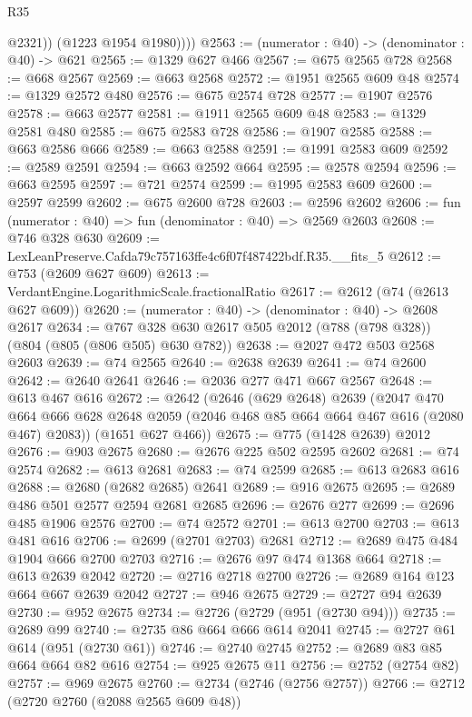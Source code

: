 \begin{lexlean}{R35}
\begin{coremodule}
              @2321))
          (@1223 @1954 @1980))))
@2563 := (numerator : @40) -> (denominator : @40) -> @621
@2565 := @1329 @627 @466
@2567 := @675 @2565 @728
@2568 := @668 @2567
@2569 := @663 @2568
@2572 := @1951 @2565 @609 @48
@2574 := @1329 @2572 @480
@2576 := @675 @2574 @728
@2577 := @1907 @2576
@2578 := @663 @2577
@2581 := @1911 @2565 @609 @48
@2583 := @1329 @2581 @480
@2585 := @675 @2583 @728
@2586 := @1907 @2585
@2588 := @663 @2586 @666
@2589 := @663 @2588
@2591 := @1991 @2583 @609
@2592 := @2589 @2591
@2594 := @663 @2592 @664
@2595 := @2578 @2594
@2596 := @663 @2595
@2597 := @721 @2574
@2599 := @1995 @2583 @609
@2600 := @2597 @2599
@2602 := @675 @2600 @728
@2603 := @2596 @2602
@2606 := fun (numerator : @40) => fun (denominator : @40) => @2569 @2603
@2608 := @746 @328 @630
@2609 := LexLeanPreserve.Cafda79c757163ffe4c6f07f487422bdf.R35.__fits_5
@2612 := @753 (@2609 @627 @609)
@2613 := VerdantEngine.LogarithmicScale.fractionalRatio
@2617 := @2612 (@74 (@2613 @627 @609))
@2620 := (numerator : @40) -> (denominator : @40) -> @2608 @2617
@2634 := @767 @328 @630 @2617 @505 @2012 (@788 (@798 @328)) (@804 (@805 (@806 @505) @630 @782))
@2638 := @2027 @472 @503 @2568 @2603
@2639 := @74 @2565
@2640 := @2638 @2639
@2641 := @74 @2600
@2642 := @2640 @2641
@2646 := @2036 @277 @471 @667 @2567
@2648 := @613 @467 @616
@2672 := @2642
    (@2646
      (@629 @2648)
      @2639
      (@2047
        @470
        @664
        @666
        @628
        @2648
        @2059
        (@2046 @468 @85 @664 @664 @467 @616 (@2080 @467) @2083))
      (@1651 @627 @466))
@2675 := @775 (@1428 @2639) @2012
@2676 := @903 @2675
@2680 := @2676 @225 @502 @2595 @2602
@2681 := @74 @2574
@2682 := @613 @2681
@2683 := @74 @2599
@2685 := @613 @2683 @616
@2688 := @2680 (@2682 @2685) @2641
@2689 := @916 @2675
@2695 := @2689 @486 @501 @2577 @2594 @2681 @2685
@2696 := @2676 @277
@2699 := @2696 @485 @1906 @2576
@2700 := @74 @2572
@2701 := @613 @2700
@2703 := @613 @481 @616
@2706 := @2699 (@2701 @2703) @2681
@2712 := @2689 @475 @484 @1904 @666 @2700 @2703
@2716 := @2676 @97 @474 @1368 @664
@2718 := @613 @2639 @2042
@2720 := @2716 @2718 @2700
@2726 := @2689 @164 @123 @664 @667 @2639 @2042
@2727 := @946 @2675
@2729 := @2727 @94 @2639
@2730 := @952 @2675
@2734 := @2726 (@2729 (@951 (@2730 @94)))
@2735 := @2689 @99
@2740 := @2735 @86 @664 @666 @614 @2041
@2745 := @2727 @61 @614 (@951 (@2730 @61))
@2746 := @2740 @2745
@2752 := @2689 @83 @85 @664 @664 @82 @616
@2754 := @925 @2675 @11
@2756 := @2752 (@2754 @82)
@2757 := @969 @2675
@2760 := @2734 (@2746 (@2756 @2757))
@2766 := @2712 (@2720 @2760 (@2088 @2565 @609 @48))

\end{coremodule}
\end{lexlean}
